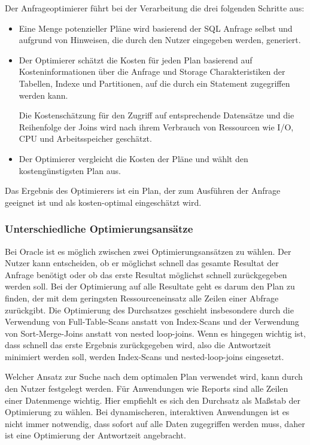 Der Anfrageoptimierer führt bei der Verarbeitung die drei folgenden Schritte aus:

\begin{itemize}
\item Eine Menge potenzieller Pläne wird basierend der SQL Anfrage selbst und aufgrund von Hinweisen, die durch den Nutzer eingegeben werden, generiert.

\item Der Optimierer schätzt die Kosten für jeden Plan basierend auf Kosteninformationen über die Anfrage und Storage Charakteristiken der Tabellen, Indexe und Partitionen, auf die durch ein Statement zugegriffen werden kann.

Die Kostenschätzung für den Zugriff auf entsprechende Datensätze und die Reihenfolge der Joins wird nach ihrem Verbrauch von Ressourcen wie I/O, CPU und Arbeitsspeicher geschätzt.

\item Der Optimierer vergleicht die Kosten der Pläne und wählt den kostengünstigsten Plan aus.
\end{itemize}

Das Ergebnis des Optimierers ist ein Plan, der zum Ausführen der Anfrage geeignet ist und als kosten-optimal eingeschätzt wird.


\subsubsection{Unterschiedliche Optimierungsansätze}



Bei Oracle ist es möglich zwischen zwei Optimierungsansätzen zu wählen. Der Nutzer kann entscheiden, ob er möglichst schnell das gesamte Resultat der Anfrage benötigt oder ob das erste Resultat möglichst schnell zurückgegeben werden soll. Bei der Optimierung auf alle Resultate geht es darum den Plan zu finden, der mit dem geringsten Ressourceneinsatz alle Zeilen einer Abfrage zurückgibt. Die Optimierung des Durchsatzes geschieht insbesondere durch die Verwendung von Full-Table-Scans anstatt von Index-Scans und der Verwendung von Sort-Merge-Joins anstatt von nested loop-joins. Wenn es hingegen wichtig ist, dass schnell das erste Ergebnis zurückgegeben wird, also die Antwortzeit minimiert werden soll, werden Index-Scans und nested-loop-joins eingesetzt.

Welcher Ansatz zur Suche nach dem optimalen Plan verwendet wird, kann durch den Nutzer festgelegt werden. Für Anwendungen wie Reports sind alle Zeilen einer Datenmenge wichtig. Hier empfiehlt es sich den Durchsatz als Maßstab der Optimierung zu wählen. Bei dynamischeren, interaktiven Anwendungen ist es nicht immer notwendig, dass sofort auf alle Daten zugegriffen werden muss, daher ist eine Optimierung der Antwortzeit angebracht.


